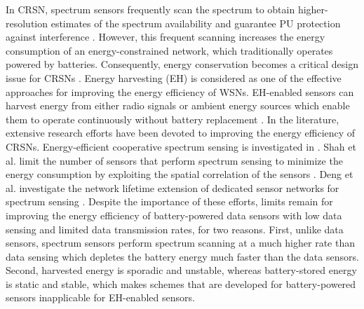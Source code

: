 \documentclass[journal]{IEEEtran} \ifCLASSINFOpdf
\begin{document}
In CRSN, spectrum sensors frequently scan the spectrum to obtain higher-resolution estimates of the spectrum availability and guarantee PU protection against interference \cite{Chang2012}. However, this frequent scanning increases the energy consumption of an energy-constrained network, which traditionally operates powered by batteries. Consequently, energy conservation becomes a critical design issue for CRSNs \cite{Ren2015, Ren2016, Su2016}. Energy harvesting (EH) is considered as one of the effective approaches for improving the energy efficiency of WSNs. EH-enabled sensors can harvest energy from either radio signals or ambient energy sources which enable them to operate continuously without battery replacement \cite{Zhang2015a}. In the literature, extensive research efforts have been devoted to improving the energy efficiency of CRSNs. Energy-efficient cooperative spectrum sensing is investigated in \cite{Shah2015, Deng2012}. Shah et al. limit the number of sensors that perform spectrum sensing to minimize the energy consumption by exploiting the spatial correlation of the sensors \cite{Shah2015}. Deng et al. investigate the network lifetime extension of dedicated sensor networks for spectrum sensing \cite{Deng2012}. Despite the importance of these efforts, limits remain for improving the energy efficiency of battery-powered data sensors with low data sensing and limited data transmission rates, for two reasons. First, unlike data sensors, spectrum sensors perform spectrum scanning at a much higher rate than data sensing which depletes the battery energy much faster than the data sensors. Second, harvested energy is sporadic and unstable, whereas battery-stored energy is static and stable, which makes schemes that are developed for battery-powered sensors inapplicable for EH-enabled sensors.
\end{document}
